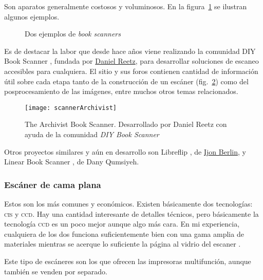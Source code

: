 \documentclass[%
	a5paper,
	10pt,
	twoside,
	openright,
	final,
]{memoir}
\begin{document}
	Son aparatos generalmente costosos y voluminosos. En la figura~\ref{fig:scannerbookScanners} se ilustran algunos ejemplos.
	\begin{figure}
		\hfill
		\caption{Dos ejemplos de \emph{book scanners}\label{fig:scannerbookScanners}}
	\end{figure}

	Es de destacar la labor que desde hace años viene realizando la comunidad DIY Book Scanner \cite{DIYBookScanner}, fundada por \href{http://www.danreetz.com}{Daniel Reetz}, para desarrollar soluciones de escaneo accesibles para cualquiera. El sitio y sus foros contienen cantidad de información útil sobre cada etapa tanto de la construcción de un escáner (fig.~\ref{fig:scannerArchivist}) como del posprocesamiento de las imágenes, entre muchos otros temas relacionados.

	\begin{figure}
		\centering
		\texttt{[image: scannerArchivist]}
		\caption[The Archivist Book Scanner]{The Archivist Book Scanner. Desarrollado por Daniel Reetz con ayuda de la comunidad \emph{DIY Book Scanner}\label{fig:scannerArchivist}}
	\end{figure}

	Otros proyectos similares y aún en desarrollo son Libreflip \cite{Libreflip}, de \href{https://www.youtube.com/c/ijonberlin}{Ijon Berlin}, y Linear Book Scanner \cite{LinearBookScanner}, de Dany Qumsiyeh.

	\subsubsection{Escáner de cama plana} Estos son los más comunes y económicos. Existen básicamente dos tecnologías: \textsc{cis} y \textsc{ccd}. Hay una cantidad interesante de detalles técnicos, pero básicamente la tecnología \textsc{ccd} es un poco mejor aunque algo más cara. En mi experiencia, cualquiera de los dos funciona suficientemente bien con una gama amplia de materiales mientras se acerque lo suficiente la página al vidrio del escaner \cite{CCDvsCIS}.

	Este tipo de escáneres son los que ofrecen las impresoras multifunción, aunque también se venden por separado.
\end{document}
